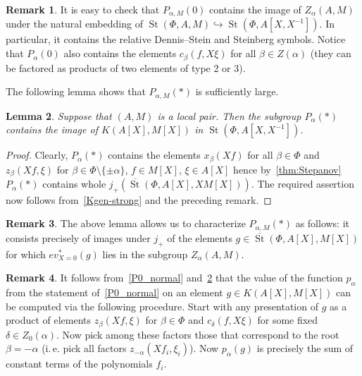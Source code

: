 \documentclass[oneside, 8pt]{amsart}
\newtheorem{lemma}{Lemma}
\theoremstyle{remark}
\theoremstyle{definition}
\newtheorem{rem}[lemma]{Remark}
\DeclareMathOperator{\St}{St}
\newcommand{\inv}{^{-1}}
\numberwithin{equation}{section}
\begin{document}
\begin{rem}\label{rem:c-DS} It is easy to check that $P_{\alpha, M}(0)$ contains the image of $Z_\alpha(A, M)$ under the natural embedding of $\St(\Phi, A, M) \hookrightarrow \St(\Phi, A[X, X\inv])$.
In particular, it contains the relative Dennis--Stein and Steinberg symbols.
Notice that $P_\alpha(0)$ also contains the elements $c_{\beta}(f, X\xi)$ for all $\beta \in Z(\alpha)$ (they can be factored as products of two elements of type 2 or 3). \end{rem}

The following lemma shows that $P_{\alpha, M}(*)$ is sufficiently large.
\begin{lemma} \label{Pstar-large} Suppose that $(A, M)$ is a local pair. Then the subgroup $P_\alpha(*)$ contains the image of $K(A[X], M[X])$ in $\St(\Phi, A[X, X^{-1}])$. \end{lemma}
\begin{proof} Clearly, $P_\alpha(*)$ contains the elements $x_\beta(Xf)$ for all $\beta \in \Phi$ and $z_\beta(Xf, \xi)$ for $\beta \in \Phi \setminus \{\pm \alpha\}$, $f \in M[X]$, $\xi\in A[X]$ hence by~\cref{thm:Stepanov} $P_\alpha(*)$ contains whole $j_+(\overline{\St}(\Phi, A[X], XM[X]))$. The required assertion now follows from~\cref{Kgen-strong} and the preceding remark. \end{proof}

\begin{rem} \label{Pstar-char} The above lemma allows us to characterize $P_{\alpha, M}(*)$ as follows: it consists precisely of images under $j_+$ of the elements 
 $g \in \overline{\St}(\Phi, A[X], M[X])$ for which $ev_{X=0}^*(g)$ lies in the subgroup $Z_\alpha(A, M)$. \end{rem} 

\begin{rem} \label{rem:palpha} It follows from~\cref{P0_normal} and~\cref{Pstar-large} that the value of the function $p_\alpha$ from the statement of~\cref{P0_normal} on an element $g\in K(A[X], M[X])$ can be computed via the following procedure. 
Start with any presentation of $g$ as a product of elements $z_{\beta}(Xf, \xi)$ for $\beta \in \Phi$ and $c_\delta(f, X\xi)$ for some fixed $\delta\in Z_0(\alpha)$. 
Now pick among these factors those that correspond to the root $\beta = -\alpha$ (i.\,e. pick all factors $z_{-\alpha}(Xf_i, \xi_i)$). 
Now $p_\alpha(g)$ is precisely the sum of constant terms of the polynomials $f_i$. \end{rem}
\end{document}
